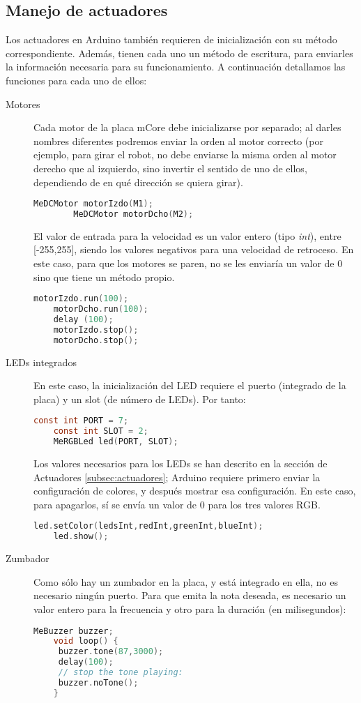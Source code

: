 \subsection{Manejo de actuadores}\label{subsec:actuadoresArduino}
Los actuadores en Arduino también requieren de inicialización con su método correspondiente. Además, tienen cada uno un método de escritura, para enviarles la información necesaria para su funcionamiento. A continuación detallamos las funciones para cada uno de ellos:

\begin{description}
	\item [Motores] Cada motor de la placa mCore debe inicializarse por separado; al darles nombres diferentes podremos enviar la orden al motor correcto (por ejemplo, para girar el robot, no debe enviarse la misma orden al motor derecho que al izquierdo, sino invertir el sentido de uno de ellos, dependiendo de en qué dirección se quiera girar). 
	\begin{lstlisting}[language=C,caption={Inicializar motores Mbot}]	
		MeDCMotor motorIzdo(M1);
		MeDCMotor motorDcho(M2);	
	\end{lstlisting}
	El valor de entrada para la velocidad es un valor entero (tipo \textit{int}), entre [-255,255], siendo los valores negativos para una velocidad de retroceso. En este caso, para que los motores se paren, no se les enviaría un valor de 0 sino que tiene un método propio.	
	\begin{lstlisting}[language=C,caption={Uso de motores Mbot}]		
	motorIzdo.run(100);
	motorDcho.run(100);
	delay (100);
	motorIzdo.stop();
	motorDcho.stop();	
	\end{lstlisting}

	\item [LEDs integrados]  En este caso, la inicialización del LED requiere el puerto (integrado de la placa) y un slot (de número de LEDs). Por tanto:
	\begin{lstlisting}[language=C,caption={Inicializar LEDs}]	
	const int PORT = 7;
	const int SLOT = 2;
	MeRGBLed led(PORT, SLOT);	
	\end{lstlisting}
	Los valores necesarios para los LEDs se han descrito en la sección de Actuadores \ref{subsec:actuadores}; Arduino requiere primero enviar la configuración de colores, y después mostrar esa configuración. En este caso, para apagarlos, sí se envía un valor de 0 para los tres valores RGB.
	\begin{lstlisting}[language=C,caption={Uso de los LEDs}]	
	led.setColor(ledsInt,redInt,greenInt,blueInt);
	led.show();	
	\end{lstlisting}

	\item [Zumbador] Como sólo hay un zumbador en la placa, y está integrado en ella, no es necesario ningún puerto. Para que emita la nota deseada, es necesario un valor entero para la frecuencia y otro para la duración (en milisegundos):
	\begin{lstlisting}[language=C,caption={Uso del zumbador}]	
	MeBuzzer buzzer;
	void loop() {
	 buzzer.tone(87,3000);
	 delay(100);
	 // stop the tone playing:
	 buzzer.noTone();
	}
	\end{lstlisting}
\end{description}

